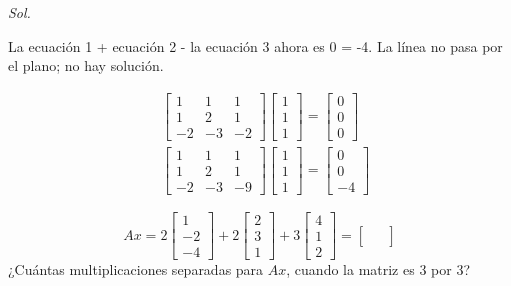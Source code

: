 \textit{ Sol. }

La ecuación 1 + ecuación 2 - la ecuación 3 ahora es 0 = -4. La línea no pasa por el plano; no hay solución.

\begin{align}
	 & \begin{bmatrix}
		   1 & 1 & 1 \\1&2&1\\ -2&-3&-2
	   \end{bmatrix}\begin{bmatrix}
		                1 \\1\\1
	                \end{bmatrix} = \begin{bmatrix}
		                                0 \\0\\0
	                                \end{bmatrix} \\
	 & \begin{bmatrix}
		   1 & 1 & 1 \\1&2&1\\ -2&-3&-9
	   \end{bmatrix}\begin{bmatrix}
		                1 \\1\\1
	                \end{bmatrix} = \begin{bmatrix}
		                                0 \\0\\-4
	                                \end{bmatrix}
\end{align}

\begin{problem}
\begin{equation*}
	Ax= 2\begin{bmatrix}
		1 \\-2\\-4
	\end{bmatrix}+2\begin{bmatrix}
		2 \\3\\1
	\end{bmatrix}+3\begin{bmatrix}
		4 \\1\\2
	\end{bmatrix}=\begin{bmatrix}
		 & \\ & \\&
	\end{bmatrix}
\end{equation*}
¿Cuántas multiplicaciones separadas para $Ax$, cuando la matriz es 3 por 3?
\end{problem}

